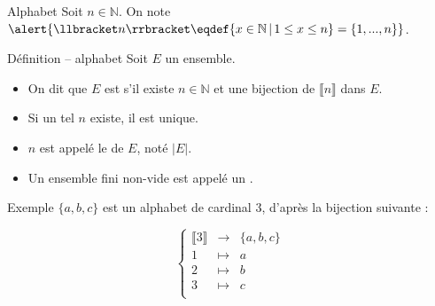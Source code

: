 
\begingroup

\begin{frame}{Alphabet}
  Soit $n\in \mathbb{N}$. On note $\alert{\llbracket n\rrbracket \eqdef \{x\in \mathbb{N} \,|\, 1 \le x \le n\} = \{1, ..., n\}}$.
  
  \begin{block}{Définition -- alphabet}
    Soit $E$ un ensemble.
    \begin{itemize}
    \item On dit que $E$ est  s'il existe $n\in \mathbb{N}$ et une bijection de $\llbracket n\rrbracket$ dans $E$. 
    \item Si un tel $n$ existe, il est unique. 
    \item $n$ est appelé le  de $E$, noté \alert{$|E|$}.
    \item Un \alert{ensemble fini non-vide} est appelé un . 
    \end{itemize}
  \end{block}

  \begin{exampleblock}{Exemple}
    $\{a, b, c\}$ est un alphabet de cardinal 3, d'après la bijection suivante :

    $$
    \left\{\begin{array}{ccl}
    \llbracket 3\rrbracket &\rightarrow& \{a, b, c\}\\
    1 &\mapsto& a\\ 
    2 &\mapsto& b\\ 
    3 &\mapsto& c\\ 
    \end{array}\right.
    $$
  \end{exampleblock}
\end{frame}
\endgroup
